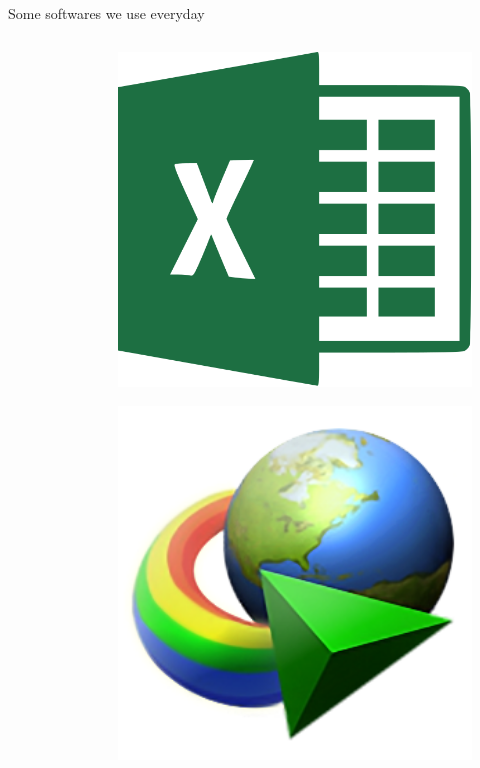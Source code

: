 \documentclass[10pt]{beamer}
\begin{document}
\begin{frame}{Some softwares we use everyday}
\begin{columns}
\begin{column}{0.33\textwidth}
\begin{figure}
                \end{figure}
            \end{column}
            \begin{column}{0.33\textwidth}
                \begin{figure}
                    \centering
                    \includegraphics[width=1\textwidth]{images/excel}
                \end{figure}
                \begin{figure}
                    \centering
                    \includegraphics[width=1\textwidth]{images/idm}

\end{figure}
\end{column}
\end{columns}
\end{frame}
\end{document}
